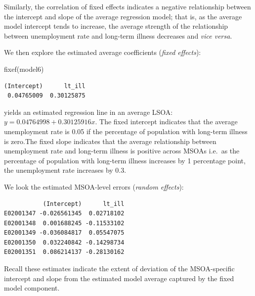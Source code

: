 \documentclass[
  letterpaper,
  DIV=11,
  numbers=noendperiod,
  oneside]{scrreprt}
\newenvironment{Shaded}{\begin{snugshade}}{\end{snugshade}}
\newcommand{\DecValTok}[1]{\textcolor[rgb]{0.68,0.00,0.00}{#1}}
\newcommand{\FunctionTok}[1]{\textcolor[rgb]{0.28,0.35,0.67}{#1}}
\newcommand{\NormalTok}[1]{\textcolor[rgb]{0.00,0.23,0.31}{#1}}
\newcommand{\OtherTok}[1]{\textcolor[rgb]{0.00,0.23,0.31}{#1}}
\newcommand{\SpecialCharTok}[1]{\textcolor[rgb]{0.37,0.37,0.37}{#1}}
\begin{document}
Similarly, the correlation of fixed effects indicates a negative
relationship between the intercept and slope of the average regression
model; that is, as the average model intercept tends to increase, the
average strength of the relationship between unemployment rate and
long-term illness decreases and \emph{vice versa}.

We then explore the estimated average coefficients (\emph{fixed
effects}):

\begin{Shaded}
\begin{Highlighting}[]
\FunctionTok{fixef}\NormalTok{(model6)}
\end{Highlighting}
\end{Shaded}

\begin{verbatim}
(Intercept)      lt_ill 
 0.04765009  0.30125875 
\end{verbatim}

yields an estimated regression line in an average LSOA:
\(y = 0.04764998 + 0.30125916x\). The fixed intercept indicates that the
average unemployment rate is 0.05 if the percentage of population with
long-term illness is zero.The fixed slope indicates that the average
relationship between unemployment rate and long-term illness is positive
across MSOAs i.e.~as the percentage of population with long-term illness
increases by 1 percentage point, the unemployment rate increases by 0.3.

We look the estimated MSOA-level errors (\emph{random effects}):

\begin{Shaded}
\end{Shaded}

\begin{verbatim}
           (Intercept)      lt_ill
E02001347 -0.026561345  0.02718102
E02001348  0.001688245 -0.11533102
E02001349 -0.036084817  0.05547075
E02001350  0.032240842 -0.14298734
E02001351  0.086214137 -0.28130162
\end{verbatim}

Recall these estimates indicate the extent of deviation of the
MSOA-specific intercept and slope from the estimated model average
captured by the fixed model component.
\end{document}
